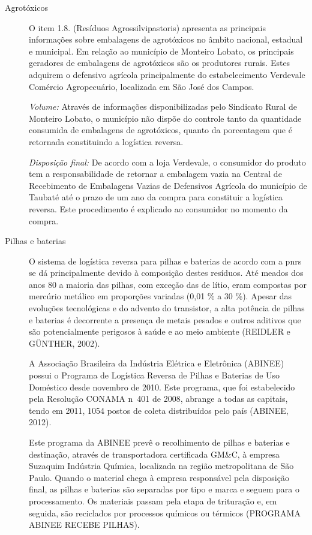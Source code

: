 	
	\begin{description}
		\item[Agrotóxicos] O item 1.8. (Resíduos Agrossilvipastoris) apresenta as principais informações sobre embalagens de agrotóxicos no âmbito nacional, estadual e municipal. Em relação ao município de Monteiro Lobato, os principais geradores de embalagens de agrotóxicos são os produtores rurais. Estes adquirem o defensivo agrícola principalmente do estabelecimento Verdevale Comércio Agropecuário, localizada em São José dos Campos.
		
			\subitem \textit{Volume:} 
			Através de informações disponibilizadas pelo Sindicato Rural de Monteiro Lobato, o município não dispõe do controle tanto da quantidade consumida de embalagens de agrotóxicos, quanto da porcentagem que é retornada constituindo a logística reversa. 
		
			\subitem \textit{Disposição final:}
			 De acordo com a loja Verdevale, o consumidor do produto tem a responsabilidade de retornar a embalagem vazia na Central de Recebimento de Embalagens Vazias de Defensivos Agrícola do município de Taubaté até o prazo de um ano da compra para constituir a logística reversa. Este procedimento é explicado ao consumidor no momento da compra.	

	
		\item[Pilhas e baterias] O sistema de logística reversa para pilhas e baterias de acordo com a \gls{pnrs} se dá principalmente devido à composição destes resíduos. Até meados dos anos 80 a maioria das pilhas, com exceção das de lítio, eram compostas por mercúrio metálico em proporções variadas (0,01 \% a 30 \%). Apesar das evoluções tecnológicas e do advento do transistor, a alta potência de pilhas e baterias é decorrente a presença de metais pesados e outros aditivos que são potencialmente perigosos à saúde e ao meio ambiente (REIDLER e GÜNTHER, 2002).
		
		A Associação Brasileira da Indústria Elétrica e Eletrônica (ABINEE) possui o Programa de Logística Reversa de Pilhas e Baterias de Uso Doméstico desde novembro de 2010. Este programa, que foi estabelecido pela Resolução CONAMA n\textdegree\ 401 de 2008, abrange a todas as capitais, tendo em 2011, 1054 postos de coleta distribuídos pelo país (ABINEE, 2012).
		
		Este programa da ABINEE prevê o recolhimento de pilhas e baterias e destinação, através de transportadora certificada GM\&C, à empresa Suzaquim Indústria Química, localizada na região metropolitana de São Paulo. Quando o material chega à empresa responsável pela disposição final, as pilhas e baterias são separadas por tipo e marca e seguem para o processamento. Os materiais passam pela etapa de trituração e, em seguida, são reciclados por processos químicos ou térmicos (PROGRAMA ABINEE RECEBE PILHAS).
		

\end{description}
